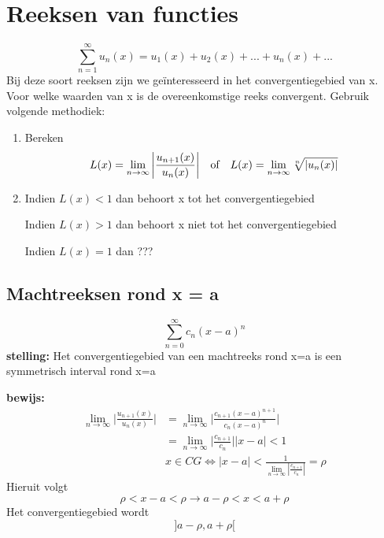 \section{Reeksen van functies}
$$\sum_{n = 1}^{\infty} u_n(x) = u_1(x) + u_2(x) + ... + u_n(x) + ...$$
Bij deze soort reeksen zijn we geïnteresseerd in het convergentiegebied van x. Voor welke waarden van x is de overeenkomstige reeks convergent.
Gebruik volgende methodiek:
\begin{enumerate}
	\item Bereken
	      $$L(x) = \lim\limits_{n\to\infty} \bigg| \frac{u_{n + 1}(x)}{u_n(x)} \bigg| \quad\hbox{of}\quad L(x) = \lim\limits_{n\to\infty} \sqrt[n]{|u_n(x)|}$$
	\item Indien $L(x) < 1$ dan behoort x tot het convergentiegebied

	      Indien $L(x) > 1$ dan behoort x niet tot het convergentiegebied

	      Indien $L(x) = 1$ dan ???

\end{enumerate}

\subsection{Machtreeksen rond x = a}
$$\sum_{n = 0}^{\infty} c_n(x - a)^n$$
\textbf{stelling:} Het convergentiegebied van een machtreeks rond x=a is een symmetrisch interval rond x=a

\textbf{bewijs:}
\begin{equation*}
	\begin{split}
		\lim\limits_{n\to\infty} \bigg|\frac{ u_{n + 1}(x)}{u_n(x)} \bigg| & = \lim\limits_{n\to\infty} \bigg|\frac{ c_{n + 1}(x - a)^{n + 1}}{c_n(x - a)^n} \bigg| \\
		& = \lim\limits_{n\to\infty} \bigg | \frac{c_{n + 1}}{c_n} \bigg | |x - a| < 1 \\
		& x \in CG \Leftrightarrow |x - a| < \frac{1}{ \lim\limits_{n\to\infty} | \frac{c_{n + 1}}{c_n}|}  = \rho
	\end{split}
\end{equation*}
Hieruit volgt $$\rho < x - a < \rho \rightarrow a - \rho < x < a + \rho$$
Het convergentiegebied wordt $$]a - \rho, a + \rho[$$

